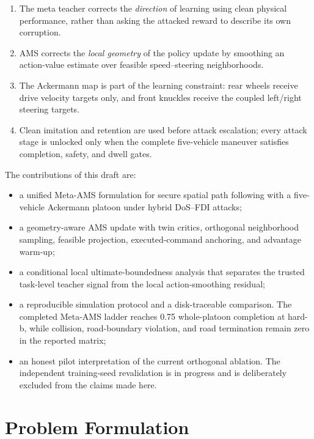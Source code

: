 \documentclass[lettersize,journal]{IEEEtran}
\begin{document}
\begin{enumerate}
\item The meta teacher corrects the \emph{direction} of learning using clean physical performance, rather than asking the attacked reward to describe its own corruption.
\item AMS corrects the \emph{local geometry} of the policy update by smoothing an action-value estimate over feasible speed--steering neighborhoods.
\item The Ackermann map is part of the learning constraint: rear wheels receive drive velocity targets only, and front knuckles receive the coupled left/right steering targets.
\item Clean imitation and retention are used before attack escalation; every attack stage is unlocked only when the complete five-vehicle maneuver satisfies completion, safety, and dwell gates.
\end{enumerate}

The contributions of this draft are:

\begin{itemize}
\item a unified Meta-AMS formulation for secure spatial path following with a five-vehicle Ackermann platoon under hybrid DoS--FDI attacks;
\item a geometry-aware AMS update with twin critics, orthogonal neighborhood sampling, feasible projection, executed-command anchoring, and advantage warm-up;
\item a conditional local ultimate-boundedness analysis that separates the trusted task-level teacher signal from the local action-smoothing residual;
\item a reproducible simulation protocol and a disk-traceable comparison. The completed Meta-AMS ladder reaches 0.75 whole-platoon completion at hard-b, while collision, road-boundary violation, and road termination remain zero in the reported matrix;
\item an honest pilot interpretation of the current orthogonal ablation. The independent training-seed revalidation is in progress and is deliberately excluded from the claims made here.
\end{itemize}

\section{Problem Formulation}
\end{document}
